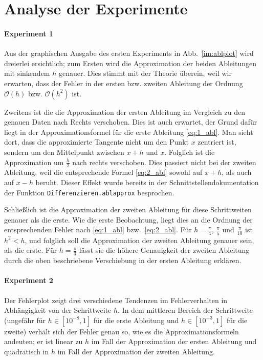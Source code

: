 \documentclass[smallheadings]{scrartcl}
\begin{document}
\section{Analyse der Experimente}

\paragraph{Experiment 1}
Aus der graphischen Ausgabe des ersten Experiments in Abb.~\ref{im:ablplot} wird dreierlei ersichtlich; zum Ersten wird die Approximation der beiden Ableitungen mit sinkendem $h$ genauer. Dies stimmt mit der Theorie überein, weil wir erwarten, dass der Fehler in der ersten bzw. zweiten Ableitung der Ordnung $\mathcal{O}(h)$ bzw. $\mathcal{O}(h^2)$ ist. 

Zweitens ist die die Approximation der ersten Ableitung im Vergleich zu den genauen Daten nach Rechts verschoben. Dies ist auch erwartet, der Grund dafür liegt in der Approximationsformel für die erste Ableitung \ref{eq:1_abl}. Man sieht dort, dass die approximierte Tangente nicht um den Punkt $x$ zentriert ist, sondern um den Mittelpunkt zwischen $x+h$ und $x$. Folglich ist die Approximation um $\frac{h}{2}$ nach rechts verschoben. Dies passiert nicht bei der zweiten Ableitung, weil die entsprechende Formel \ref{eq:2_abl} sowohl auf $x+h$, als auch auf $x-h$ beruht. Dieser Effekt wurde bereits in der Schnittstellendokumentation der Funktion \texttt{Differenzieren.ablapprox} besprochen.

Schließlich ist die Approximation der zweiten Ableitung für diese Schrittweiten genauer als die erste. Wie die erste Beobachtung, liegt dies an die Ordnung der entsprechenden Fehler nach \eqref{eq:1_abl} bzw.~\eqref{eq:2_abl}. Für $h=\frac{\pi}{4}$, $\frac{\pi}{5}$ und $\frac{\pi}{10}$ ist $h^2<h$, und folglich soll die Approximation der zweiten Ableitung genauer sein, als die erste. Für $h=\frac{\pi}{3}$ lässt sie die höhere Genauigkeit der zweiten Ableitung durch die oben beschriebene Verschiebung in der ersten Ableitung erklären. 

\paragraph{Experiment 2}


Der Fehlerplot zeigt drei verschiedene Tendenzen im Fehlerverhalten in Abhängigkeit von der Schrittweite $h$. In dem mittleren Bereich der Schrittweite (ungefähr für $h\in\left[10^{-8}, 1\right]$ für die erste Ableitung und $h\in[10^{-3}, 1] $ für die zweite) verhält sich der Fehler genau so, wie es die Approximationsformeln andeuten; er ist linear zu $h$ im Fall der Approximation der ersten Ableitung und quadratisch in $h$ im Fall der Approximation der zweiten Ableitung. 
\end{document}
